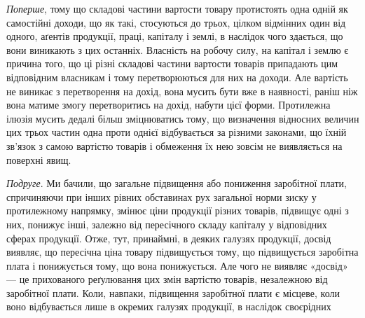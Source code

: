 \emph{Поперше}, тому що складові частини вартости товару протистоять одна
одній як самостійні доходи, що як такі, стосуються до трьох, цілком відмінних
один від одного, аґентів продукції, праці, капіталу і землі, в наслідок
чого здається, що вони виникають з цих останніх. Власність на робочу силу, на
капітал і землю є причина того, що ці різні складові частини вартости товарів
припадають цим відповідним власникам і тому перетворюються для них на доходи.
Але вартість не виникає з перетворення на дохід, вона мусить бути вже в наявності,
раніш ніж вона матиме змогу перетворитись на дохід, набути цієї
форми. Протилежна ілюзія мусить дедалі більш зміцнюватись тому, що визначення
відносних величин цих трьох частин одна проти однієї відбувається за
різними законами, що їхній зв’язок з самою вартістю товарів і обмеження їх
нею зовсім не виявляється на поверхні явищ.

\emph{Подруге}. Ми бачили, що загальне підвищення або пониження заробітної
плати, спричиняючи при інших рівних обставинах рух загальної норми
зиску у протилежному напрямку, змінює ціни продукції різних товарів, підвищує
одні з них, понижує інші, залежно від пересічного складу капіталу у відповідних
сферах продукції. Отже, тут, принаймні, в деяких галузях продукції,
досвід виявляє, що пересічна ціна товару підвищується тому, що підвищується
заробітна плата і понижується тому, що вона понижується. Але чого не виявляє
«досвід» — це прихованого реґулювання цих змін вартістю товарів, незалежною
від заробітної плати. Коли, навпаки, підвищення заробітної плати є місцеве, коли
воно відбувається лише в окремих галузях продукції, в наслідок своєрідних
\parbreak{}  %
